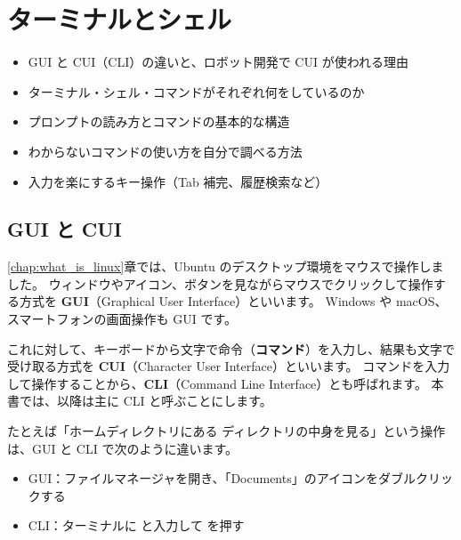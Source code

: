 \chapter{ターミナルとシェル}
\label{chap:terminal_shell}

\begin{goalbox}
  \begin{itemize}
    \item GUI と CUI（CLI）の違いと、ロボット開発で CUI が使われる理由
    \item ターミナル・シェル・コマンドがそれぞれ何をしているのか
    \item プロンプトの読み方とコマンドの基本的な構造
    \item わからないコマンドの使い方を自分で調べる方法
    \item 入力を楽にするキー操作（Tab 補完、履歴検索など）
  \end{itemize}
\end{goalbox}

\section{GUI と CUI}
\label{sec:terminal-gui-cui}

\ref{chap:what_is_linux}章では、Ubuntu のデスクトップ環境をマウスで操作しました。
ウィンドウやアイコン、ボタンを見ながらマウスでクリックして操作する方式を \textbf{GUI}（Graphical User Interface）といいます。
Windows や macOS、スマートフォンの画面操作も GUI です。

これに対して、キーボードから文字で命令（\textbf{コマンド}）を入力し、結果も文字で受け取る方式を \textbf{CUI}（Character User Interface）といいます。
コマンドを入力して操作することから、\textbf{CLI}（Command Line Interface）とも呼ばれます。
本書では、以降は主に CLI と呼ぶことにします。

たとえば「ホームディレクトリにある  ディレクトリの中身を見る」という操作は、GUI と CLI で次のように違います。

\begin{itemize}
  \item GUI：ファイルマネージャを開き、「Documents」のアイコンをダブルクリックする
  \item CLI：ターミナルに  と入力して  を押す
\end{itemize}


